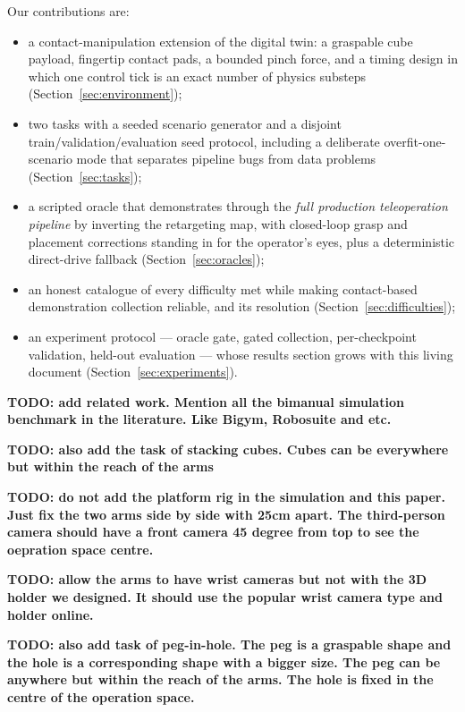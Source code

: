 Our contributions are:
\begin{itemize}
  \item a contact-manipulation extension of the digital twin: a graspable
    cube payload, fingertip contact pads, a bounded pinch force, and a
    timing design in which one control tick is an exact number of
    physics substeps (Section~\ref{sec:environment});
  \item two tasks with a seeded scenario generator and a disjoint
    train/validation/evaluation seed protocol, including a deliberate
    overfit-one-scenario mode that separates pipeline bugs from data
    problems (Section~\ref{sec:tasks});
  \item a scripted oracle that demonstrates through the \emph{full
    production teleoperation pipeline} by inverting the retargeting map,
    with closed-loop grasp and placement corrections standing in for the
    operator's eyes, plus a deterministic direct-drive fallback
    (Section~\ref{sec:oracles});
  \item an honest catalogue of every difficulty met while making
    contact-based demonstration collection reliable, and its resolution
    (Section~\ref{sec:difficulties});
  \item an experiment protocol --- oracle gate, gated collection,
    per-checkpoint validation, held-out evaluation --- whose results
    section grows with this living document
    (Section~\ref{sec:experiments}).
\end{itemize}

\textbf{TODO: add related work. Mention all the bimanual simulation benchmark in the literature. Like Bigym, Robosuite and etc.}

\textbf{TODO: also add the task of stacking cubes. Cubes can be everywhere but within the reach of the arms}

\textbf{TODO: do not add the platform rig in the simulation and this paper. Just fix the two arms side by side with 25cm apart. The third-person camera should have a front camera 45 degree from top to see the oepration space centre.}

\textbf{TODO: allow the arms to have wrist cameras but not with the 3D holder we designed. It should use the popular wrist camera type and holder online.}

\textbf{TODO: also add task of peg-in-hole. The peg is a graspable shape and the hole is a corresponding shape with a bigger size. The peg can be anywhere but within the reach of the arms. The hole is fixed in the centre of the operation space.}

